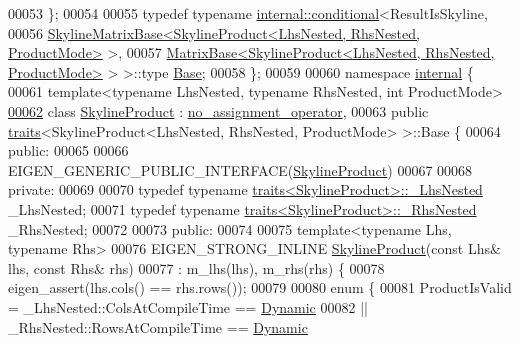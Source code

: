 \begin{DoxyCode}
00053     \};
00054 
00055     \textcolor{keyword}{typedef} \textcolor{keyword}{typename} \hyperlink{struct_eigen_1_1internal_1_1conditional}{internal::conditional}<ResultIsSkyline,
00056             \hyperlink{class_eigen_1_1_skyline_matrix_base}{SkylineMatrixBase<SkylineProduct<LhsNested, RhsNested, ProductMode>}
       >,
00057             \hyperlink{group___core___module_class_eigen_1_1_matrix_base}{MatrixBase<SkylineProduct<LhsNested, RhsNested, ProductMode>}
       > >::type \hyperlink{class_eigen_1_1internal_1_1_tensor_lazy_evaluator_writable}{Base};
00058 \};
00059 
00060 \textcolor{keyword}{namespace }\hyperlink{namespaceinternal}{internal} \{
00061 \textcolor{keyword}{template}<\textcolor{keyword}{typename} LhsNested, \textcolor{keyword}{typename} RhsNested, \textcolor{keywordtype}{int} ProductMode>
\hyperlink{class_eigen_1_1internal_1_1_skyline_product}{00062} \textcolor{keyword}{class }\hyperlink{class_eigen_1_1internal_1_1_skyline_product}{SkylineProduct} : \hyperlink{class_eigen_1_1internal_1_1no__assignment__operator}{no\_assignment\_operator},
00063 \textcolor{keyword}{public} \hyperlink{struct_eigen_1_1internal_1_1traits}{traits}<SkylineProduct<LhsNested, RhsNested, ProductMode> >::Base \{
00064 \textcolor{keyword}{public}:
00065 
00066     EIGEN\_GENERIC\_PUBLIC\_INTERFACE(\hyperlink{class_eigen_1_1internal_1_1_skyline_product}{SkylineProduct})
00067 
00068 \textcolor{keyword}{private}:
00069 
00070     \textcolor{keyword}{typedef} \textcolor{keyword}{typename} \hyperlink{struct_eigen_1_1internal_1_1traits}{traits<SkylineProduct>::\_LhsNested} \_LhsNested;
00071     \textcolor{keyword}{typedef} \textcolor{keyword}{typename} \hyperlink{struct_eigen_1_1internal_1_1traits}{traits<SkylineProduct>::\_RhsNested} \_RhsNested;
00072 
00073 \textcolor{keyword}{public}:
00074 
00075     \textcolor{keyword}{template}<\textcolor{keyword}{typename} Lhs, \textcolor{keyword}{typename} Rhs>
00076     EIGEN\_STRONG\_INLINE \hyperlink{class_eigen_1_1internal_1_1_skyline_product}{SkylineProduct}(\textcolor{keyword}{const} Lhs& lhs, \textcolor{keyword}{const} Rhs& rhs)
00077     : m\_lhs(lhs), m\_rhs(rhs) \{
00078         eigen\_assert(lhs.cols() == rhs.rows());
00079 
00080         \textcolor{keyword}{enum} \{
00081             ProductIsValid = \_LhsNested::ColsAtCompileTime == \hyperlink{namespace_eigen_ad81fa7195215a0ce30017dfac309f0b2}{Dynamic}
00082             || \_RhsNested::RowsAtCompileTime == \hyperlink{namespace_eigen_ad81fa7195215a0ce30017dfac309f0b2}{Dynamic}

\end{DoxyCode}
